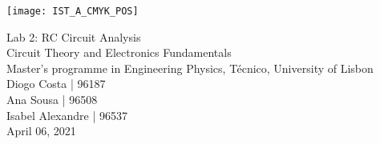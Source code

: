 
\thispagestyle {empty}

\texttt{[image: IST\_A\_CMYK\_POS]}

\begin{center}
%
\vspace{1.0cm}

\vspace{1cm}
{\FontLb \Huge Lab 2: RC Circuit Analysis} \\ %
\vspace{1cm}
{\FontSn \Large Circuit Theory and Electronics Fundamentals} \\ %
{\FontSn \large Master's programme in Engineering Physics, Técnico, University of Lisbon} \\ %
\vspace{1cm}
{\FontSn Diogo Costa | 96187} \\
{\FontSn Ana Sousa | 96508} \\
{\FontSn Isabel Alexandre | 96537} \\
\vspace{1cm}
{\FontSn April 06, 2021} \\ %
%
\end{center}


